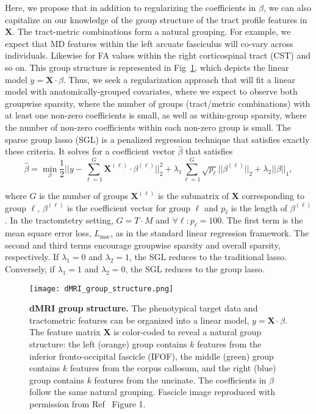 Here, we propose that in addition to regularizing the coefficients in $\beta$,
we can also capitalize on our knowledge of the group structure of the tract
profile features in $\mathbf{X}$. The tract-metric combinations form a natural
grouping. For example, we expect that MD features within the left arcuate
fasciculus will co-vary across individuals. Likewise for FA values within the
right corticospinal tract (CST) and so on. This group structure is represented
in Fig~\ref{fig:group-structure}, which depicts the linear model $y = \mathbf{X}
\cdot \beta$. Thus, we seek a regularization approach that will fit a linear
model with anatomically-grouped covariates, where we expect to observe both
groupwise sparsity, where the number of groups (tract/metric combinations) with
at least one non-zero coefficients is small, as well as within-group sparsity,
where the number of non-zero coefficients within each non-zero group is small.
The sparse group lasso (SGL)
is a penalized regression technique that satisfies exactly these
criteria\cite{simon2013sparse}. It solves for a coefficient vector
$\hat{\beta}$ that satisfies
\begin{equation}
    \hat{\beta} = \min_\beta \frac{1}{2}
    ||y - \displaystyle \sum_{\ell = 1}^{G}
    \mathbf{X}^{(\ell)} \cdot \beta^{(\ell)}||_2^2
    + \lambda_1 \displaystyle \sum_{\ell = 1}^{G}
    \sqrt{p_\ell} ||\beta^{(\ell)}||_2
    + \lambda_2 ||\beta||_1,
    \label{eq:sgl}
\end{equation}

where $G$ is the number of groups $\mathbf{X}^{(\ell)}$ is the submatrix
of $\mathbf{X}$ corresponding to group $\ell$, $\beta^{(\ell)}$ is
the coefficient vector for group $\ell$ and $p_\ell$ is the length of
$\beta^{(\ell)}$. In the tractomtetry setting, $G = T \cdot M$ and
$\forall \ell: p_\ell = 100$. The first term is the mean square error
loss, $L_{\text{mse}}$, as in the standard linear regression framework.
The second and third terms encourage groupwise sparsity and overall
sparsity, respectively. If $\lambda_1 = 0$ and $\lambda_2 = 1$, the
SGL reduces to the traditional lasso\cite{tibshirani1996regression}.
Conversely, if $\lambda_1 = 1$ and $\lambda_2 = 0$, the SGL reduces to
the group lasso\cite{yuan2006model}.

\begin{figure}[!h]
    \centering
    \texttt{[image: dMRI\_group\_structure.png]}
    \caption{{\bf dMRI group structure.}
        The phenotypical target data and tractometric features can be organized
    into a linear model, $y = \mathbf{X} \cdot \beta$. The feature matrix
    $\mathbf{X}$ is color-coded to reveal a natural group structure: the left
    (orange) group contains $k$ features from the inferior fronto-occipital
    fascicle (IFOF), the middle (green) group contains $k$ features from the
    corpus callosum, and the right (blue) group contains $k$ features from the
    uncinate. The coefficients in $\beta$ follow the same natural grouping.
    Fascicle image reproduced with permission from Ref~\cite{yeatman2012tract}
    Figure 1.}
    \label{fig:group-structure}
\end{figure}


